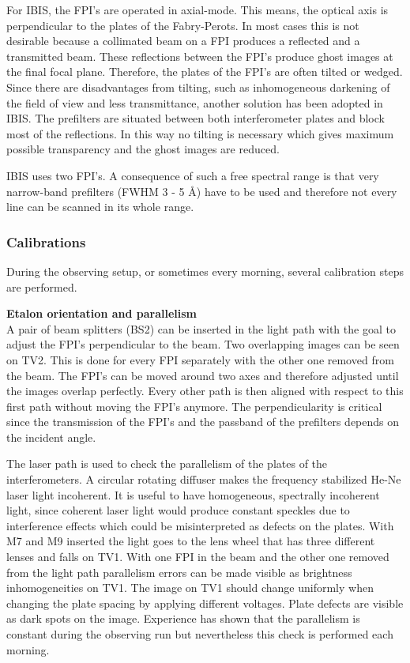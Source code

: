 \documentclass[a4paper,11pt]{article}
\begin{document}
For IBIS, the FPI's are operated in axial-mode. This means, the optical axis is perpendicular to the plates of the Fabry-Perots. In most cases this is not desirable because a collimated beam on a FPI produces a reflected and a transmitted beam. These reflections between the FPI's produce ghost images at the final focal plane. Therefore, the plates of the FPI's are often tilted or wedged. Since there are disadvantages from tilting, such as inhomogeneous darkening of the field of view and less transmittance, another solution has been adopted in IBIS. The prefilters are situated between both interferometer plates and block most of the reflections. In this way no tilting is necessary which gives maximum possible transparency and the ghost images are reduced.

IBIS uses two FPI's. A consequence of such a free spectral range is that very narrow-band prefilters (FWHM 3 - 5 \AA) have to be used and therefore not every line can be scanned in its whole range.



\subsubsection{Calibrations}
During the observing setup, or sometimes every morning, several calibration steps are performed. 

\textbf{Etalon orientation and parallelism}\\
A pair of beam splitters (BS2) can be inserted in the light path with the goal to adjust the FPI's perpendicular to the beam. Two overlapping images can be seen on TV2. This is done for every FPI separately with the other one removed from the beam. The FPI's can be moved around two axes and therefore adjusted until the images overlap perfectly. Every other path is then aligned with respect to this first path without moving the FPI's anymore. The perpendicularity is critical since the transmission of the FPI's and the passband of the prefilters depends on the incident angle.

The laser path is used to check the parallelism of the plates of the interferometers.  A circular rotating diffuser makes the frequency stabilized He-Ne laser light incoherent. It is useful to have homogeneous, spectrally incoherent light, since coherent laser light would produce constant speckles due to interference effects which could be misinterpreted as defects on the plates. With M7 and M9 inserted the light goes to the lens wheel that has three different lenses and falls on TV1. With one FPI in the beam and the other one removed from the light path parallelism errors can be made visible as brightness inhomogeneities on TV1. The image on TV1 should change uniformly when changing the plate spacing by applying different voltages. Plate defects are visible as dark spots on the image. Experience has shown that the parallelism is constant during the observing run but nevertheless this check is performed each morning.
\end{document}
